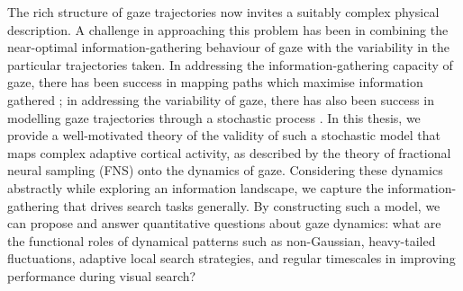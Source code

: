 The rich structure of gaze trajectories now invites a suitably complex physical description. A challenge in approaching this problem has been in combining the near-optimal information-gathering behaviour of gaze with the variability in the particular trajectories taken. In addressing the information-gathering capacity of gaze, there has been success in mapping paths which maximise information gathered \cite{Ruarte2024.11.29.626088, najemnik_eye_2008, najemnik_optimal_2005, sims_optimal_2019}; in addressing the variability of gaze, there has also been success in modelling gaze trajectories through a stochastic process \cite{engbert_integrated_2011, papanikolaou_levy_2024}. In this thesis, we provide a well-motivated theory of the validity of such a stochastic model that maps complex adaptive cortical activity, as described by the theory of fractional neural sampling (FNS) \cite{qi_fractional_2022, chen_spatiotemporal_2022} onto the dynamics of gaze. Considering these dynamics abstractly while exploring an information landscape, we capture the information-gathering that drives search tasks generally. By constructing such a model, we can propose and answer quantitative questions about gaze dynamics: what are the functional roles of dynamical patterns such as non-Gaussian, heavy-tailed fluctuations, adaptive local search strategies, and regular timescales in improving performance during visual search? 

